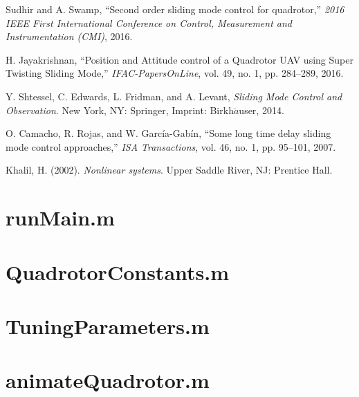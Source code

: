\documentclass[12pt]{article}
\begin{document}
\newpage
\begin{thebibliography}{9}
Sudhir and A. Swamp, “Second order sliding mode control for quadrotor,” \textit{2016 IEEE First International Conference on Control, Measurement and Instrumentation (CMI)}, 2016.

H. Jayakrishnan, “Position and Attitude control of a Quadrotor UAV using Super Twisting Sliding Mode,” \textit{IFAC-PapersOnLine}, vol. 49, no. 1, pp. 284–289, 2016.

Y. Shtessel, C. Edwards, L. Fridman, and A. Levant, \textit{Sliding Mode Control and Observation}. New York, NY: Springer, Imprint: Birkh$\ddot{a}$user, 2014.

O. Camacho, R. Rojas, and W. García-Gabín, “Some long time delay sliding mode control approaches,” \textit{ISA Transactions}, vol. 46, no. 1, pp. 95–101, 2007.

Khalil, H. (2002). \textit{Nonlinear systems}. Upper Saddle River, NJ: Prentice Hall.
\end{thebibliography}



\newpage
\appendix
\section{runMain.m}


\section{QuadrotorConstants.m}


\section{TuningParameters.m}


\section{animateQuadrotor.m}

\end{document}
